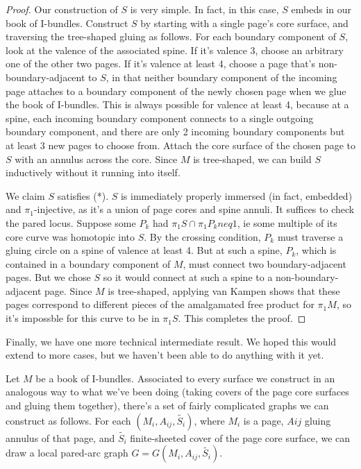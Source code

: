 \documentclass[12pt]{amsart}
\theoremstyle{definition}
\begin{document}
\begin{proof}

Our construction of $S$ is very simple. In fact, in this case, $S$ embeds in our
book of I-bundles. Construct $S$ by starting with a single page's core surface,
and traversing the tree-shaped gluing as follows. For each boundary component
of $S$, look at the valence of the associated spine. If it's valence 3, choose an
arbitrary one of the other two pages. If it's valence at least 4, choose a page
that's non-boundary-adjacent to $S$, in that neither boundary component of the
incoming page attaches to a boundary component of the newly chosen page when we
glue the book of I-bundles. This is always possible for valence at least 4,
because at a spine, each incoming boundary component connects to a single
outgoing boundary component, and there are only 2 incoming boundary components
but at least 3 new pages to choose from. Attach the core surface of the chosen
page to $S$ with an annulus across the core. Since $M$ is tree-shaped, we can build
$S$ inductively without it running into itself.

We claim $S$ satisfies (*). $S$ is immediately properly immersed (in fact,
embedded) and $\pi_1$-injective, as it's a union of page cores and spine annuli. It
suffices to check the pared locus. Suppose some $P_k$ had $\pi_1S \cap \pi_1P_k neq
1$, ie some multiple of its core curve was homotopic into $S$. By the crossing
condition, $P_k$ must traverse a gluing circle on a spine of valence at least 4.
But at such a spine, $P_k$, which is contained in a boundary component of $M$, must
connect two boundary-adjacent pages. But we chose $S$ so it would
connect at such a spine to a non-boundary-adjacent page. Since $M$ is
tree-shaped, applying van Kampen shows that these pages correspond to
different pieces of the amalgamated free product for $\pi_1M$, so it's impossble
for this curve to be in $\pi_1S$. This completes the proof.

\end{proof}

Finally, we have one more technical intermediate result. We hoped this would
extend to more cases, but we haven't been able to do anything with it yet.

Let $M$ be a book of I-bundles. Associated to every surface we construct in an
analogous way to what we've been doing (taking covers of the page core surfaces
and gluing them together), there's a set of fairly complicated graphs we can
construct as follows. For each $(M_i,A_{ij},\widetilde{S_i})$, where $M_i$ is a page, $Aij$ gluing
annulus of that page, and $\widetilde{S_i}$ finite-sheeted cover of the page core
surface, we can draw a local pared-arc graph $G=G(M_i,A_{ij},\widetilde{S_i})$.
\end{document}
